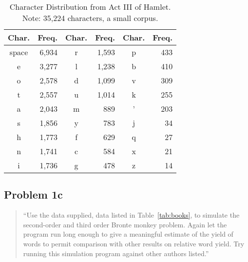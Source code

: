 \documentclass[conference]{IEEEtran}
\begin{document}
\begin{table}
\caption{\hspace{2em}Character Distribution from Act III of Hamlet. \newline
Note: 35,224 characters, a small corpus.\label{tab:hamlet}}
\vspace{-10pt}
\begin{center}
\begin{tabular}{crcrcr}
\hline
Char. & Freq. & Char. & Freq. & Char. & Freq. \\
\hline
space & 6,934  & r     & 1,593  & p     & 433   \\
e     & 3,277  & l     & 1,238  & b     & 410   \\
o     & 2,578  & d     & 1,099  & v     & 309   \\
t     & 2,557  & u     & 1,014  & k     & 255   \\
a     & 2,043  & m     & 889   & '     & 203   \\
s     & 1,856  & y     & 783   & j     & 34    \\
h     & 1,773  & f     & 629   & q     & 27    \\
n     & 1,741  & c     & 584   & x     & 21    \\
i     & 1,736  & g     & 478   & z     & 14    \\
\hline
\end{tabular}
\end{center}
\end{table}


\subsection{Problem 1c}

\begin{quote}
``Use the data supplied, data listed in Table~\ref{tab:books}, to simulate the 
second-order and third order Bronte monkey problem. Again let the program run 
long enough to give a meaningful estimate of the yield of words to permit 
comparison with other results on relative word yield. Try running this 
simulation program against other authors listed.''
\end{quote}
\end{document}
